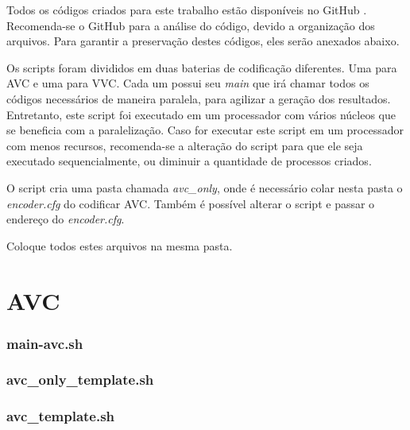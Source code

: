 Todos os códigos criados para este trabalho estão disponíveis no GitHub \cite{my_scripts}.
Recomenda-se o GitHub para a análise do código, devido a organização dos arquivos.
Para garantir a preservação destes códigos, eles serão anexados abaixo.

Os scripts foram divididos em duas baterias de codificação diferentes. Uma para 
\acrshort{AVC} e uma para \acrshort{VVC}. Cada um possui seu \textit{main} que
irá chamar todos os códigos necessários de maneira paralela, para agilizar a 
geração dos resultados. Entretanto, este script foi executado em um processador
com vários núcleos que se beneficia com a paralelização. Caso for executar este
script em um processador com menos recursos, recomenda-se a alteração do script
para que ele seja executado sequencialmente, ou diminuir a quantidade de processos
criados.

O script cria uma pasta chamada \textit{avc\_only}, onde é necessário colar nesta
pasta o \textit{encoder.cfg} do codificar \acrshort{AVC}. Também é possível alterar
o script e passar o endereço do \textit{encoder.cfg}.

Coloque todos estes arquivos na mesma pasta.



\section{AVC}

\subsubsection{main-avc.sh}


\subsubsection{avc\_only\_template.sh}


\subsubsection{avc\_template.sh}


